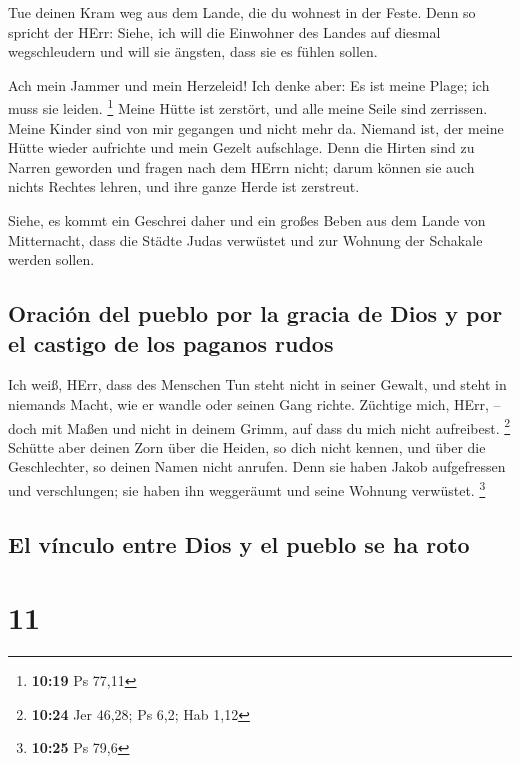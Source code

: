  Tue deinen Kram weg aus dem Lande, die du wohnest in der
Feste.  Denn so spricht der HErr: Siehe, ich will die
Einwohner des Landes auf diesmal wegschleudern und will sie ängsten,
dass sie es fühlen sollen.

 Ach mein Jammer und mein Herzeleid! Ich denke aber: Es
ist meine Plage; ich muss sie leiden. \footnote{\textbf{10:19} Ps 77,11}
 Meine Hütte ist zerstört, und alle meine Seile sind
zerrissen. Meine Kinder sind von mir gegangen und nicht mehr da. Niemand
ist, der meine Hütte wieder aufrichte und mein Gezelt aufschlage.
 Denn die Hirten sind zu Narren geworden und fragen nach
dem HErrn nicht; darum können sie auch nichts Rechtes lehren, und ihre
ganze Herde ist zerstreut.

 Siehe, es kommt ein Geschrei daher und ein großes Beben
aus dem Lande von Mitternacht, dass die Städte Judas verwüstet und zur
Wohnung der Schakale werden sollen.

\hypertarget{oraciuxf3n-del-pueblo-por-la-gracia-de-dios-y-por-el-castigo-de-los-paganos-rudos}{%
\subsection{Oración del pueblo por la gracia de Dios y por el castigo de
los paganos
rudos}\label{oraciuxf3n-del-pueblo-por-la-gracia-de-dios-y-por-el-castigo-de-los-paganos-rudos}}

 Ich weiß, HErr, dass des Menschen Tun steht nicht in
seiner Gewalt, und steht in niemands Macht, wie er wandle oder seinen
Gang richte.  Züchtige mich, HErr, -- doch mit Maßen und
nicht in deinem Grimm, auf dass du mich nicht aufreibest. \footnote{\textbf{10:24}
  Jer 46,28; Ps 6,2; Hab 1,12}  Schütte aber deinen Zorn
über die Heiden, so dich nicht kennen, und über die Geschlechter, so
deinen Namen nicht anrufen. Denn sie haben Jakob aufgefressen und
verschlungen; sie haben ihn weggeräumt und seine Wohnung verwüstet.
\footnote{\textbf{10:25} Ps 79,6}

\hypertarget{el-vuxednculo-entre-dios-y-el-pueblo-se-ha-roto}{%
\subsection{El vínculo entre Dios y el pueblo se ha
roto}\label{el-vuxednculo-entre-dios-y-el-pueblo-se-ha-roto}}

\hypertarget{section-10}{%
\section{11}\label{section-10}}

